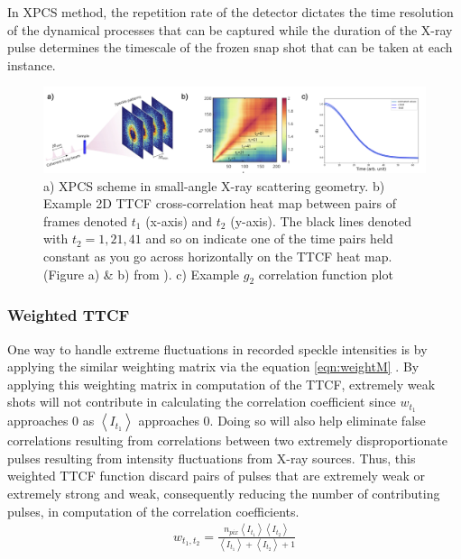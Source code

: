 \documentclass[11pt]{article}
\theoremstyle{definition}
\begin{document}
In XPCS method, the repetition rate of the detector dictates the time resolution of the dynamical processes that can be captured \cite{jo_single_2023} while the duration of the X-ray pulse determines the timescale of the frozen snap shot that can be taken at each instance.
\begin{figure}[ht!]
    \centering
    \includegraphics[width=165mm]{figures/xpcs_fig.001.jpeg}
    \caption{a) XPCS scheme in small-angle X-ray scattering geometry. b) Example 2D TTCF cross-correlation heat map between pairs of frames denoted $t_1$ (x-axis) and $t_2$ (y-axis). The black lines denoted with \(t_2 = 1, 21, 41\) and so on indicate one of the time pairs held constant as you go across horizontally on the TTCF heat map. (Figure a) \& b) from \cite{lehmkuhler_femtoseconds_2021}). c) Example \(g_2\) correlation function plot}
    \label{fig:xpcs_example}
\end{figure}
\subsubsection{Weighted TTCF}
One way to handle extreme fluctuations in recorded speckle intensities is by applying the similar weighting matrix via the equation \eqref{eqn:weightM} \cite{cao_effect_2020}. By applying this weighting matrix in computation of the TTCF, extremely weak shots will not contribute in calculating the correlation coefficient since $ w_{t_1}$ approaches 0 as $\left<I_{t_1}\right>$ approaches 0. Doing so will also help eliminate false correlations resulting from correlations between two extremely disproportionate pulses resulting from intensity fluctuations from X-ray sources. Thus, this weighted TTCF function discard pairs of pulses that are extremely weak or extremely strong and weak, consequently reducing the number of contributing pulses, in computation of the correlation coefficients.
\begin{align}\label{eqn:weightM}
w_{t_1, t_2} = \frac{n_{pix} \left<I_{t_1}\right> \left<I_{t_2}\right>}{\left<I_{t_1}\right> + \left<I_{t_2}\right> + 1}
\end{align}
\end{document}

